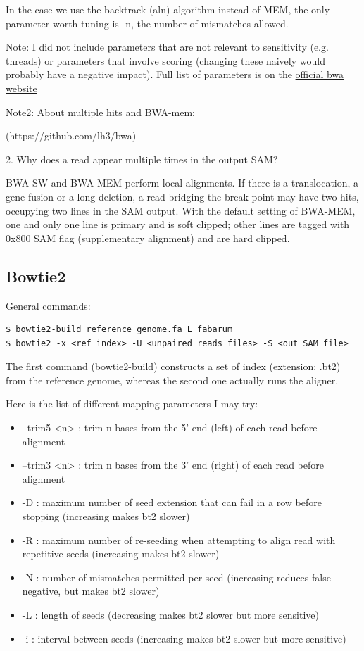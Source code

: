 \documentclass[10pt,a4paper]{report}
\begin{document}
In the case we use the backtrack (aln) algorithm instead of MEM, the only parameter worth tuning is -n, the number of mismatches allowed. 


Note: I did not include parameters that are not relevant to sensitivity (e.g. threads) or parameters that involve scoring (changing these naively would probably have a negative impact). Full list of parameters is on the \href{http://bio-bwa.sourceforge.net/bwa.shtml}{official bwa website}

Note2: About multiple hits and BWA-mem: 

(https://github.com/lh3/bwa)

2. Why does a read appear multiple times in the output SAM?

BWA-SW and BWA-MEM perform local alignments. If there is a translocation, a gene fusion or a long deletion, a read bridging the break point may have two hits, occupying two lines in the SAM output. With the default setting of BWA-MEM, one and only one line is primary and is soft clipped; other lines are tagged with 0x800 SAM flag (supplementary alignment) and are hard clipped.


\subsection{Bowtie2}
General commands: 
\begin{lstlisting}
$ bowtie2-build reference_genome.fa L_fabarum
$ bowtie2 -x <ref_index> -U <unpaired_reads_files> -S <out_SAM_file>
\end{lstlisting}
The first command (bowtie2-build) constructs a set of index (extension: .bt2) from the reference genome, whereas the second one actually runs the aligner.

Here is the list of different mapping parameters I may try:
\begin{itemize}
\item --trim5 <n> : trim n bases from the 5' end (left) of each read before alignment
\item --trim3 <n> : trim n bases from the 3' end (right) of each read before alignment
\item -D : maximum number of seed extension that can fail in a row before stopping (increasing makes bt2 slower)
\item -R : maximum number of re-seeding when attempting to align read with repetitive seeds (increasing makes bt2 slower)
\item -N : number of mismatches permitted per seed (increasing reduces false negative, but makes bt2 slower)
\item -L : length of seeds (decreasing makes bt2 slower but more sensitive)
\item -i : interval between seeds (increasing makes bt2 slower but more sensitive)
\end{itemize}
\end{document}
